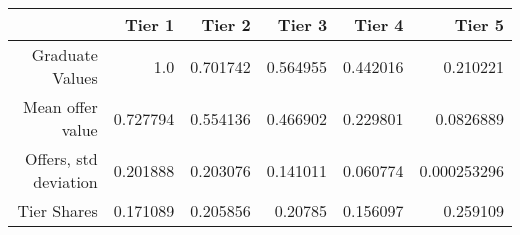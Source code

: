 \begin{tabular}{rrrrrr}
  \hline
   & \textbf{Tier 1} & \textbf{Tier 2} & \textbf{Tier 3} & \textbf{Tier 4} & \textbf{Tier 5} \\\hline
  Graduate Values & 1.0 & 0.701742 & 0.564955 & 0.442016 & 0.210221 \\
  Mean offer value & 0.727794 & 0.554136 & 0.466902 & 0.229801 & 0.0826889 \\
  Offers, std deviation & 0.201888 & 0.203076 & 0.141011 & 0.060774 & 0.000253296 \\
  Tier Shares & 0.171089 & 0.205856 & 0.20785 & 0.156097 & 0.259109 \\\hline
\end{tabular}
